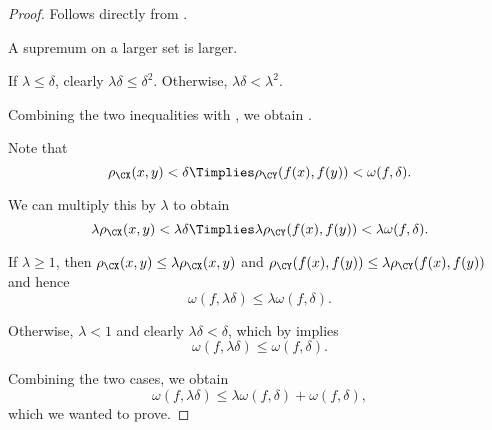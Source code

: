 \begin{proof}
   Follows directly from .

   A supremum on a larger set is larger.

   If \( \lambda \leq \delta \), clearly \( \lambda \delta \leq \delta^2 \). Otherwise, \( \lambda \delta < \lambda^2 \).

  Combining the two inequalities with , we obtain .

   Note that
  \begin{equation*}
    \rho_{\CX}(x, y) < \delta \Timplies \rho_{\CY}(f(x), f(y)) < \omega(f, \delta).
  \end{equation*}

  We can multiply this by \( \lambda \) to obtain
  \begin{equation*}
    \lambda \rho_{\CX}(x, y) < \lambda \delta \Timplies \lambda \rho_{\CY}(f(x), f(y)) < \lambda \omega(f, \delta).
  \end{equation*}

  If \( \lambda \geq 1 \), then \( \rho_{\CX}(x, y) \leq \lambda \rho_{\CX}(x, y) \) and \( \rho_{\CY}(f(x), f(y)) \leq \lambda \rho_{\CY}(f(x), f(y)) \) and hence
  \begin{equation*}
    \omega(f, \lambda \delta) \leq \lambda \omega(f, \delta).
  \end{equation*}

  Otherwise, \( \lambda < 1 \) and clearly \( \lambda \delta < \delta \), which by  implies
  \begin{equation*}
    \omega(f, \lambda \delta) \leq \omega(f, \delta).
  \end{equation*}

  Combining the two cases, we obtain
  \begin{equation*}
    \omega(f, \lambda \delta) \leq \lambda \omega(f, \delta) + \omega(f, \delta),
  \end{equation*}
  which we wanted to prove.
\end{proof}
